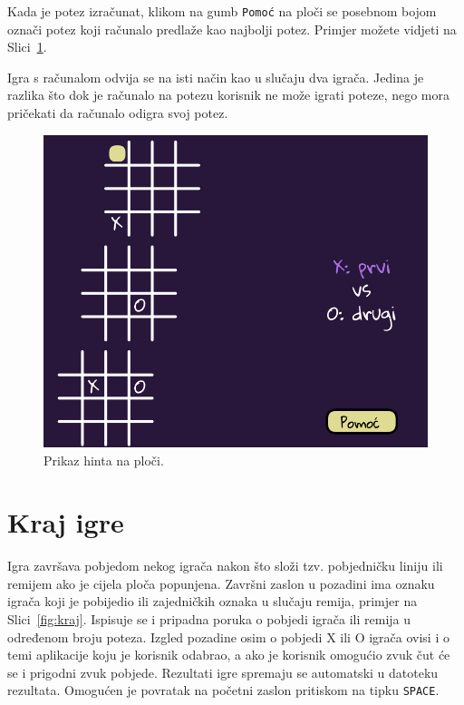 \documentclass[12pt]{scrartcl}
\begin{document}
Kada je potez izračunat, klikom na gumb \texttt{Pomoć} na ploči se posebnom bojom označi potez koji računalo predlaže kao najbolji potez. Primjer možete vidjeti na Slici~\ref{fig:hint}.

Igra s računalom odvija se na isti način kao u slučaju dva igrača. Jedina je razlika što dok je računalo na potezu korisnik ne može igrati poteze, nego mora pričekati da računalo odigra svoj potez. 

\begin{figure}[ht]
	\centering
	\includegraphics[scale=0.4]{hint.png}
	\caption{Prikaz hinta na ploči.}
	\label{fig:hint}
\end{figure}

\newpage \section{Kraj igre}\label{sec:kraj}
Igra završava pobjedom nekog igrača nakon što složi tzv. pobjedničku liniju ili remijem ako je cijela ploča popunjena. Završni zaslon u pozadini ima oznaku igrača koji je pobijedio ili zajedničkih oznaka u slučaju remija, primjer na Slici~\ref{fig:kraj}. Ispisuje se i pripadna poruka o pobjedi igrača ili remija u određenom broju poteza. Izgled pozadine osim o pobjedi X ili O igrača ovisi i o temi aplikacije koju je korisnik odabrao, a ako je korisnik omogućio zvuk čut će se i prigodni zvuk pobjede. Rezultati igre spremaju se automatski u datoteku rezultata. Omogućen je povratak na početni zaslon pritiskom na tipku \texttt{SPACE}. 
\end{document}
